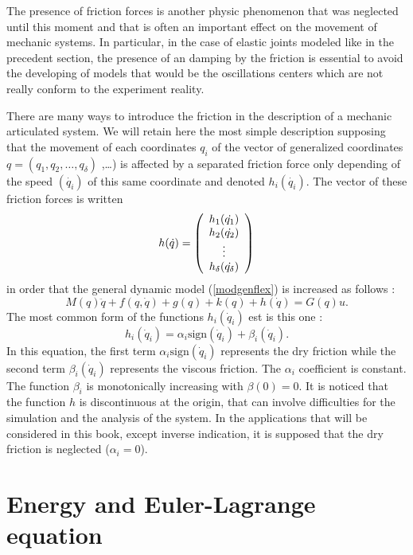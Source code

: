 The presence of friction forces is another physic phenomenon that was neglected until this moment and that is often an important effect on the movement of mechanic systems. In particular, in the case of elastic joints modeled like in the precedent section, the presence of an damping by the friction is essential to avoid the developing of models that would be the oscillations centers which are not really conform to the experiment reality.

There are many ways to introduce the friction in the description of a mechanic articulated system. We will retain here the most simple description supposing  that the movement of each coordinates  $q_i$ of the vector of generalized coordinates  $q = (q_1, q_2, \hdots , q_\delta)$ ,…) is affected by a separated friction force only depending of the speed  $(\dot{q_i})$ of this same coordinate and denoted $h_i(\dot{q_i})$. The vector of these friction forces is written   
$$
h(\dot{q}) = \bma{c} h_1(\dot{q_1}) \\ h_2(\dot{q_2}) \\ \vdots \\ h_{\delta}(\dot{q_\delta}) \ema
$$
in order that the general dynamic model (\ref{modgenflex}) is increased as follows  :
$$
M(q)\ddot{q} + f(q,\dot q) + g(q) + k(q) + h(\dot{q}) = G(q)u. \label{modgenflexfrot}
$$
The most common form of the functions $h_i(\dot q_i)$ est is this one :
$$
h_i(\dot q_i) = \alpha_{i}\mbox{sign}(\dot q_i) + \beta_i(\dot q_i).
$$
In this equation, the first term  $\alpha_{i}\mbox{sign}(\dot q_i)$ represents the dry friction while the second term $\beta_i(\dot q_i)$ represents the viscous friction. The $\alpha_i$ coefficient is constant. The function $\beta_i$ is monotonically increasing with $\beta(0) = 0$. It is noticed that the function $h$ is discontinuous at the origin, 
that can involve difficulties for the simulation and the analysis of the system. In the applications that will be considered in this book, except inverse indication, it is supposed that the dry friction is neglected ($\alpha_i = 0$).

\section{Energy and Euler-Lagrange equation} 

